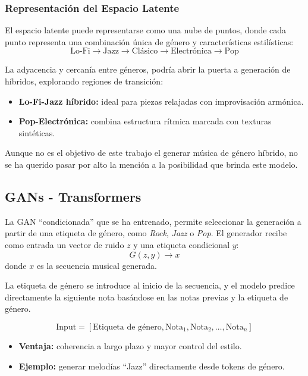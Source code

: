 \subsubsection{Representación del Espacio Latente}
El espacio latente puede representarse como una nube de puntos, donde cada punto representa una combinación única de género y características estilísticas:
\[
\text{Lo-Fi} \longrightarrow \text{Jazz} \longrightarrow \text{Clásico} \longrightarrow \text{Electrónica} \longrightarrow \text{Pop}
\]

La adyacencia y cercanía entre géneros, podría abrir la puerta a generación de híbridos, explorando regiones de transición:
\begin{itemize}
  \item \textbf{Lo-Fi-Jazz híbrido:} ideal para piezas relajadas con improvisación armónica.
  \item \textbf{Pop-Electrónica:} combina estructura rítmica marcada con texturas sintéticas.
\end{itemize}

Aunque no es el objetivo de este trabajo el generar música de género híbrido, no se ha querido pasar por alto la mención a la posibilidad que brinda este modelo.


\subsection{GANs - Transformers}

La GAN ``condicionada'' que se ha entrenado, permite seleccionar la generación a partir de una etiqueta de género, como \textit{Rock}, \textit{Jazz} o \textit{Pop}. El generador recibe como entrada un vector de ruido \( z \) y una etiqueta condicional \( y \):
\[
G(z, y) \rightarrow x
\]
donde \( x \) es la secuencia musical generada. 

La etiqueta de género se introduce al inicio de la secuencia, y el modelo predice directamente la siguiente nota basándose en las notas previas y la etiqueta de género.

\[
\text{Input} = [\text{Etiqueta de género}, \text{Nota}_1, \text{Nota}_2, \ldots, \text{Nota}_n]
\]

\begin{itemize}
  \item \textbf{Ventaja:} coherencia a largo plazo y mayor control del estilo.
  \item \textbf{Ejemplo:} generar melodías ``Jazz'' directamente desde tokens de género.
\end{itemize}
